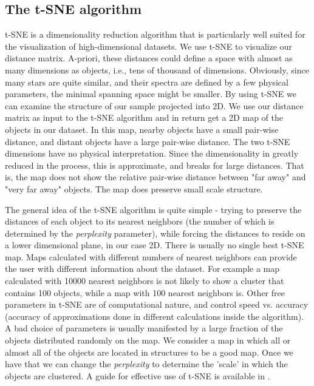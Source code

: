 \documentclass[fleqn,usenatbib]{mnras}
\begin{document}
\subsection{The t-SNE algorithm} 
t-SNE is a dimensionality reduction algorithm that is particularly well suited for the visualization of high-dimensional datasets. We use t-SNE to visualize our distance matrix. A-priori, these distances could define a space with almost as many dimensions as objects, i.e., tens of thousand of dimensions. Obviously, since many stars are quite similar, and their spectra are defined by a few physical parameters, the minimal spanning space might be smaller. By using t-SNE we can examine the structure of our sample projected into 2D.  We use our distance matrix as input to the t-SNE algorithm and in return get a 2D map of the objects in our dataset. In this map, nearby objects have a small pair-wise distance, and distant objects have a large pair-wise distance. The two t-SNE dimensions have no physical interpretation. Since the dimensionality in greatly reduced in the process, this is approximate, and breaks for large distances. That is, the map does not show the relative pair-wise distance between "far away" and "very far away" objects. The map does preserve small scale structure. 

The general idea of the t-SNE algorithm is quite simple - trying to preserve the distances of each object to its nearest neighbors (the number of which is determined by the \textit{perplexity} parameter), while forcing the distances to reside on a lower dimensional plane, in our case 2D. There is usually no single best t-SNE map. Maps calculated with different numbers of nearest neighbors can provide the user with different information about the dataset. For example a map calculated with 10000 nearest neighbors is not likely to show a cluster that contains 100 objects, while a map with 100 nearest neighbors is.  Other free parameters in t-SNE are of computational nature, and control speed vs. accuracy (accuracy of approximations done in different calculations inside the algorithm). A bad choice of parameters is usually manifested by a large fraction of the objects distributed randomly on the map. We consider a map in which all or almost all of the objects are located in structures to be a good map. Once we have that we can change the \textit{perplexity} to determine the 'scale' in which the objects are clustered. A guide for effective use of t-SNE is available in \citet{wattenberg2016how}.
\end{document}
